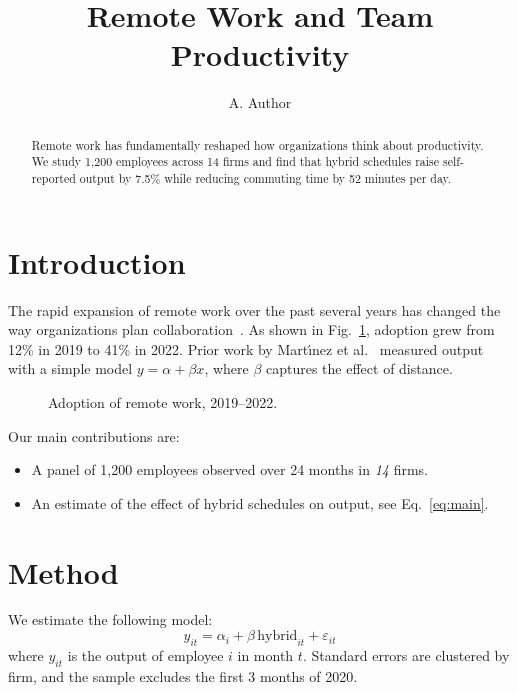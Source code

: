 \documentclass{article}
\title{Remote Work and Team Productivity}
\author{A. Author}
\begin{document}
\maketitle

\begin{abstract}
Remote work has fundamentally reshaped how organizations think about productivity.
We study 1,200 employees across 14 firms and find that hybrid schedules raise
self-reported output by 7.5\% while reducing commuting time by 52 minutes per day.
\end{abstract}

\section{Introduction}\label{sec:intro}
The rapid expansion of remote work over the past several years has changed the way
organizations plan collaboration~\cite{smith2020,lee2021}. As shown in
Fig.~\ref{fig:trend}, adoption grew from 12\% in 2019 to 41\% in 2022. %
Prior work by Mart\'{\i}nez et al.~\cite{martinez2019} measured output with a simple
model $y = \alpha + \beta x$, where $\beta$ captures the effect of distance.

\begin{figure}[t]
  \centering
  \caption{Adoption of remote work, 2019--2022.}
  \label{fig:trend}
\end{figure}

Our main contributions are:
\begin{itemize}
  \item A panel of 1,200 employees observed over 24 months in \emph{14} firms.
  \item An estimate of the effect of hybrid schedules on output, see Eq.~\eqref{eq:main}.
\end{itemize}

\section{Method}
We estimate the following model:
\begin{equation}
  y_{it} = \alpha_i + \beta \, \text{hybrid}_{it} + \varepsilon_{it}
  \label{eq:main}
\end{equation}
where $y_{it}$ is the output of employee $i$ in month $t$. Standard errors are
clustered by firm, and the sample excludes the first 3 months of 2020.
\end{document}
